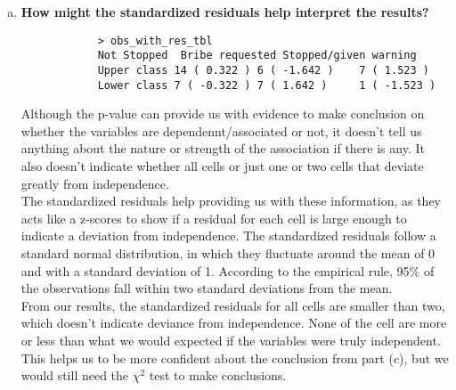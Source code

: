 \documentclass[12pt,letterpaper]{article}
\begin{document}
\begin{enumerate} [(a)]
	\item \textbf{How might the standardized residuals help interpret the results?} \\
		
		\begin{verbatim}
			> obs_with_res_tbl
			Not Stopped  Bribe requested Stopped/given warning
			Upper class 14 ( 0.322 ) 6 ( -1.642 )    7 ( 1.523 )          
			Lower class 7 ( -0.322 ) 7 ( 1.642 )     1 ( -1.523 )  
		\end{verbatim}
	Although the p-value can provide us with evidence to make conclusion on whether the variables are dependennt/associated or not, it doesn't tell us anything about the nature or strength of the association if there is any. It also doesn't indicate whether all cells or just one or two cells that deviate greatly from independence. \\
	The standardized residuals help providing us with these information, as they acts like a z-scores to show if a residual for each cell is large enough to indicate a deviation from independence. The standardized residuals follow a standard normal distribution, in which they fluctuate around the mean of 0 and with a standard deviation of 1. According to the empirical rule, 95\% of the observations fall within two standard deviations from the mean. \\
	From our results, the standardized residuals for all cells are smaller than two, which doesn't indicate deviance from independence. None of the cell are more or less than what we would expected if the variables were truly independent. This helps us to be more confident about the conclusion from part (c), but we would still need the $\chi^2$ test to make conclusions.
\end{enumerate}
\end{document}
